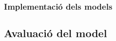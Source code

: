 \documentclass[12pt,a4paper,twoside]{book}
\begin{document}
\subsubsection{Implementació dels models}


\subsection{Avaluació del model}

    





\end{document}
